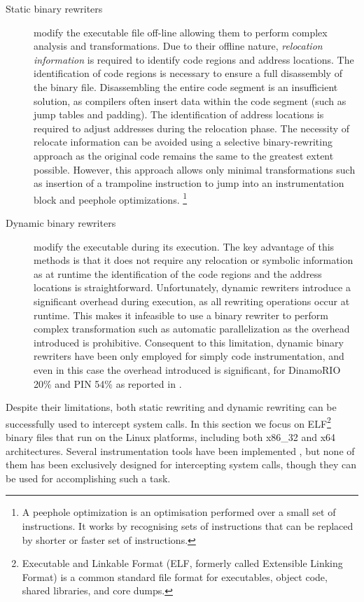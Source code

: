 \begin{description}

\item[Static binary rewriters] modify the executable file off-line allowing them to perform complex analysis and transformations. Due to their offline nature, \emph{relocation information} is required to identify code regions and address locations. The identification of code regions is necessary to ensure a full disassembly of the binary file. Disassembling  the entire code segment is an insufficient solution, as  compilers often insert data within the code segment (such as jump tables and padding). The identification of address locations is required to adjust addresses during the relocation phase. The necessity of relocate information can be avoided using a selective binary-rewriting approach \cite{BIRD, seccompsandbox} as the original code remains the same to the greatest extent possible. However, this approach allows only minimal transformations such as insertion of a trampoline instruction to jump into an instrumentation block and peephole optimizations. \footnote{A peephole optimization is an optimisation performed over a small set of instructions. It works by recognising sets of instructions that can be replaced by shorter or faster set of instructions.}

\item[Dynamic binary rewriters] modify the executable during its execution. The key advantage of this methods is that it does not require any relocation or symbolic information as at runtime the identification of the code regions and the address locations is straightforward. Unfortunately, dynamic rewriters introduce a significant overhead during execution, as all rewriting operations occur at runtime. This makes it infeasible to use a binary rewriter to perform complex transformation such as automatic parallelization as the overhead introduced is prohibitive. Consequent to this limitation, dynamic binary rewriters have been only employed for simply code instrumentation, and even in this case the overhead introduced is significant, for DinamoRIO 20\% and PIN 54\% as reported in \cite{Strata}. 
\end{description}

Despite their limitations, both static rewriting and dynamic rewriting can be successfully used to intercept system calls. In this section we focus on ELF\footnote{Executable and Linkable Format (ELF, formerly called Extensible Linking Format) is a common standard file format for executables, object code, shared libraries, and core dumps.} binary files that run on the Linux platforms, including both x86\_32 and x64 architectures. Several instrumentation tools have been implemented \cite{PEBIL, BIRD, REINS}, but none of them has been exclusively designed for intercepting system calls, though they can be used for accomplishing such a task. 

